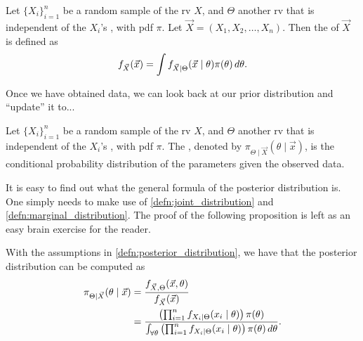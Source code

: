 \documentclass[notoc,notitlepage]{tufte-book}
\begin{document}
\begin{defn}\label{defn:marginal_distribution}
  Let $\{ X_i \}_{i=1}^{n}$ be a random sample of the rv $X$, and $\Theta$ 
  another rv that is independent of the $X_i$'s , with pdf $\pi$. Let
  $\vec{X} = (X_1, X_2, \ldots, X_n)$. Then the  of
  $\vec{X}$ is defined as
  \begin{equation*}
    f_{\vec{X}}(\vec{x}) = \int f_{\vec{X} \mid \Theta}(\vec{x} \mid
    \theta)\pi(\theta) \mathop{}\!d{\theta}.
  \end{equation*}
\end{defn}

Once we have obtained data, we can look back at our prior distribution and
``update'' it to...

\begin{defn}\label{defn:posterior_distribution}
  Let $\{ X_i \}_{i=1}^{n}$ be a random sample of the rv $X$, and $\Theta$ 
  another rv that is independent of the $X_i$'s , with pdf $\pi$.
  The , denoted by $\pi_{\Theta \mid
  \vec{X}}(\theta \mid \vec{x})$, is the conditional probability distribution of
  the parameters given the observed data.
\end{defn}

It is easy to find out what the general formula of the posterior distribution
is. One simply needs to make use of \cref{defn:joint_distribution} and
\cref{defn:marginal_distribution}. The proof of the following proposition is
left as an easy brain exercise for the reader. 

\begin{propo}\label{propo:formula_for_the_posterior_distribution}
  With the assumptions in \cref{defn:posterior_distribution}, we have that the
  posterior distribution can be computed as
  \begin{align*}
    \pi_{\Theta \mid \vec{X}}(\theta \mid \vec{x})
    &= \frac{f_{\vec{X}, \Theta}(\vec{x}, \theta)}{f_{\vec{X}}(\vec{x})} \\
    &= \frac{\left( \prod_{i=1}^{n} f_{X_i \mid \Theta}(x_i \mid \theta) \right)
      \pi(\theta)}{\int_{\forall \theta} \left( \prod_{i=1}^{n} f_{X_i \mid
      \Theta}(x_i \mid \theta) \right) \pi(\theta) \mathop{}\!d{\theta}}.
  \end{align*}
\end{propo}
\end{document}

